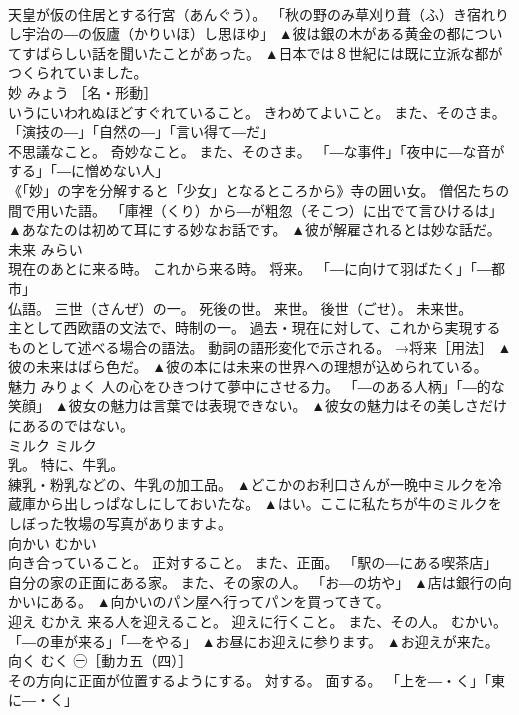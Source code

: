 \documentclass[8pt]{extreport}
\begin{document}
\begin{CJK}{UTF8}{min}
\\	天皇が仮の住居とする行宮（あんぐう）。 「秋の野のみ草刈り葺（ふ）き宿れりし宇治の―の仮廬（かりいほ）し思ほゆ」	▲彼は銀の木がある黄金の都についてすばらしい話を聞いたことがあった。 ▲日本では８世紀には既に立派な都がつくられていました。
\\	妙	みょう	［名・形動］ 
\\	いうにいわれぬほどすぐれていること。 きわめてよいこと。 また、そのさま。 「演技の―」「自然の―」「言い得て―だ」 
\\	不思議なこと。 奇妙なこと。 また、そのさま。 「―な事件」「夜中に―な音がする」「―に憎めない人」 
\\	《「妙」の字を分解すると「少女」となるところから》寺の囲い女。 僧侶たちの間で用いた語。 「庫裡（くり）から―が粗忽（そこつ）に出でて言ひけるは」	▲あなたのは初めて耳にする妙なお話です。 ▲彼が解雇されるとは妙な話だ。
\\	未来	みらい	
\\	現在のあとに来る時。 これから来る時。 将来。 「―に向けて羽ばたく」「―都市」 
\\	仏語。 三世（さんぜ）の一。 死後の世。 来世。 後世（ごせ）。 未来世。 
\\	主として西欧語の文法で、時制の一。 過去・現在に対して、これから実現するものとして述べる場合の語法。 動詞の語形変化で示される。 →将来［用法］	▲彼の未来はばら色だ。 ▲彼の本には未来の世界への理想が込められている。
\\	魅力	みりょく	人の心をひきつけて夢中にさせる力。 「―のある人柄」「―的な笑顔」	▲彼女の魅力は言葉では表現できない。 ▲彼女の魅力はその美しさだけにあるのではない。
\\	ミルク	ミルク	
\\	乳。 特に、牛乳。 
\\	練乳・粉乳などの、牛乳の加工品。	▲どこかのお利口さんが一晩中ミルクを冷蔵庫から出しっぱなしにしておいたな。 ▲はい。ここに私たちが牛のミルクをしぼった牧場の写真がありますよ。
\\	向かい	むかい	
\\	向き合っていること。 正対すること。 また、正面。 「駅の―にある喫茶店」 
\\	自分の家の正面にある家。 また、その家の人。 「お―の坊や」	▲店は銀行の向かいにある。 ▲向かいのパン屋へ行ってパンを買ってきて。
\\	迎え	むかえ	来る人を迎えること。 迎えに行くこと。 また、その人。 むかい。 「―の車が来る」「―をやる」	▲お昼にお迎えに参ります。 ▲お迎えが来た。
\\	向く	むく	㊀［動カ五（四）］ 
\\	その方向に正面が位置するようにする。 対する。 面する。 「上を―・く」「東に―・く」 

\end{CJK}
\end{document}
